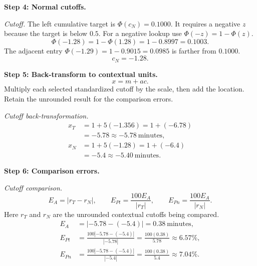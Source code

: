 \begin{enumerate}[leftmargin=*,label=\textbf{\arabic*.},itemsep=12pt,parsep=3pt,topsep=5pt]
\begin{minipage}{\linewidth}
\end{minipage}\par
\par\textbf{Step 4: Normal cutoffs.}\nopagebreak\enspace \par\noindent\begin{minipage}{\linewidth}
\par\textit{Cutoff.} The left cumulative target is $\Phi(c_{N})=0.1000$. It requires a negative $z$ because the target is below $0.5$. For a negative lookup use $\Phi(-z)=1-\Phi(z)$.\[
\Phi(-1.28)=1-\Phi(1.28)=1-0.8997=0.1003.
\]
The adjacent entry $\Phi(-1.29)=1-0.9015=0.0985$ is farther from $0.1000$.\[
c_{N}=-1.28.
\]
\end{minipage}\par

\par\noindent\begin{minipage}{\linewidth}
\par\textbf{Step 5: Back-transform to contextual units.}\nopagebreak\enspace \[
x=m+ac.
\]
Multiply each selected standardized cutoff by the scale, then add the location. Retain the unrounded result for the comparison errors.
\par\textit{Cutoff back-transformation.}
\[
\begin{aligned}x_T&=1+5(-1.356)=1+(-6.78)\\&=-5.78\approx\boxed{-5.78\ \text{minutes}},\\x_N&=1+5(-1.28)=1+(-6.4)\\&=-5.4\approx\boxed{-5.40\ \text{minutes}}.\end{aligned}
\]

\end{minipage}\par
\par\textbf{Step 6: Comparison errors.}\nopagebreak\enspace \par\noindent\begin{minipage}{\linewidth}
\par\textit{Cutoff comparison.}
\[
E_A=|r_T-r_N|,\qquad E_{Pt}=\frac{100E_A}{|r_T|},\qquad E_{Pn}=\frac{100E_A}{|r_N|}.
\]
Here $r_T$ and $r_N$ are the unrounded contextual cutoffs being compared.
\[
\begin{aligned}
E_A&=|-5.78-(-5.4)|=0.38\ \text{minutes},\\
E_{Pt}&=\frac{100|-5.78-(-5.4)|}{|-5.78|}=\frac{100(0.38)}{5.78}\approx 6.57\%,\\
E_{Pn}&=\frac{100|-5.78-(-5.4)|}{|-5.4|}=\frac{100(0.38)}{5.4}\approx 7.04\%.
\end{aligned}
\]
\end{minipage}\par


\end{enumerate}
